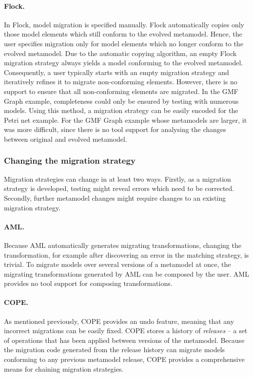 \paragraph{Flock.} In Flock, model migration is specified manually. Flock automatically copies only those model elements which still conform to the evolved metamodel. Hence, the user specifies migration only for model elements which no longer conform to the evolved metamodel.
%
Due to the automatic copying algorithm, an empty Flock migration strategy always yields a model conforming to the evolved metamodel. Consequently, a user typically starts with an empty migration strategy and iteratively refines it to migrate non-conforming elements. However, there is no support to ensure that all non-conforming elements are migrated. In the GMF Graph example, completeness could only be ensured by testing with numerous models.
%
Using this method, a migration strategy can be easily encoded for the Petri net example. For the GMF Graph example whose metamodels are larger, it was more difficult, since there is no tool support for analysing the changes between original and evolved metamodel. %

\subsubsection{Changing the migration strategy}
Migration strategies can change in at least two ways. Firstly, as a migration strategy is developed, testing might reveal errors which need to be corrected. Secondly, further metamodel changes might require changes to an existing migration strategy.

\paragraph{AML.}  Because AML automatically generates migrating transformations, changing the transformation, for example after discovering an error in the matching strategy, is trivial. To migrate models over several versions of a metamodel at once, the migrating transformations generated by AML can be composed by the user. AML provides no tool support for composing transformations.

\paragraph{COPE.} As mentioned previously, COPE provides an undo feature,
meaning that any incorrect migrations can be easily fixed. COPE stores a history of \emph{releases} -- a set of operations that has been applied between versions of the metamodel. Because the migration code generated from the release history can migrate models conforming to any previous metamodel release, COPE provides a comprehensive means for chaining migration strategies. 

